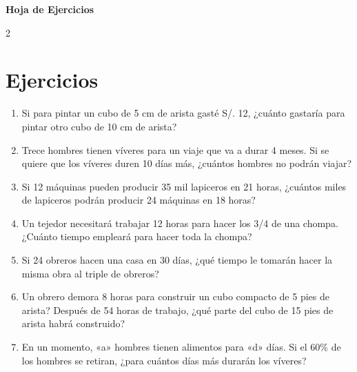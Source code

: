 \documentclass[10pt]{article}
\begin{document}
	\begin{center}
		\Large\bfseries Hoja de Ejercicios
	\end{center}

	\begin{multicols}{2}

		\section*{Ejercicios}

		\begin{enumerate}[label=\textbf{\arabic*.}]
			\item Si para pintar un cubo de 5 cm de arista gasté S/.
			12, ¿cuánto gastaría para pintar otro cubo de 10
			cm de arista?
			\vspace{0.4cm}

			\item Trece hombres tienen víveres para un viaje que va
			a durar 4 meses. Si se quiere que los víveres duren
			10 días más, ¿cuántos hombres no podrán viajar?
			\vspace{0.4cm}

			\item Si 12 máquinas pueden producir 35 mil lapiceros
			en 21 horas, ¿cuántos miles de lapiceros podrán
			producir 24 máquinas en 18 horas?
			\vspace{0.4cm}

			\item Un tejedor necesitará trabajar 12 horas para hacer
			los 3/4 de una chompa. ¿Cuánto tiempo empleará
			para hacer toda la chompa?
			\vspace{0.4cm}

			\item Si 24 obreros hacen una casa en 30 días,
			¿qué tiempo le tomarán hacer la misma obra al
			triple de obreros?
			\vspace{0.4cm}

			\item Un obrero demora 8 horas para construir un cubo
			compacto de 5 pies de arista? Después de 54 horas
			de trabajo, ¿qué parte del cubo de 15 pies de arista
			habrá construido?
			\vspace{0.4cm}

			\item En un momento, «a» hombres tienen alimentos
			para «d» días. Si el 60\% de los hombres se retiran,
			¿para cuántos días más durarán los víveres?
			\vspace{0.4cm}


\end{enumerate}
\end{multicols}
\end{document}
